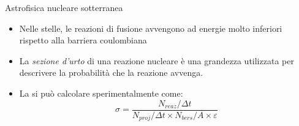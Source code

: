\documentclass [xcolor=svgnames, 9pt] {beamer}
\begin{document}
%		
%	
	
	
	\begin{frame}{Astrofisica nucleare sotterranea}
		\begin{itemize}
			\item Nelle stelle, le reazioni di fusione avvengono ad energie molto inferiori rispetto alla barriera coulombiana
			\item La \emph{sezione d'urto} di una reazione nucleare è una grandezza utilizzata per descrivere la probabilità che la reazione avvenga.
			\item La si può calcolare sperimentalmente come:
			\begin{equation}
				\sigma = \dfrac{N_{reaz}/\Delta t}{N_{proj}/\Delta t \times N_{bers}/A \times \varepsilon}
			\end{equation}
		\end{itemize}
	\end{frame}%
	
\end{document}
